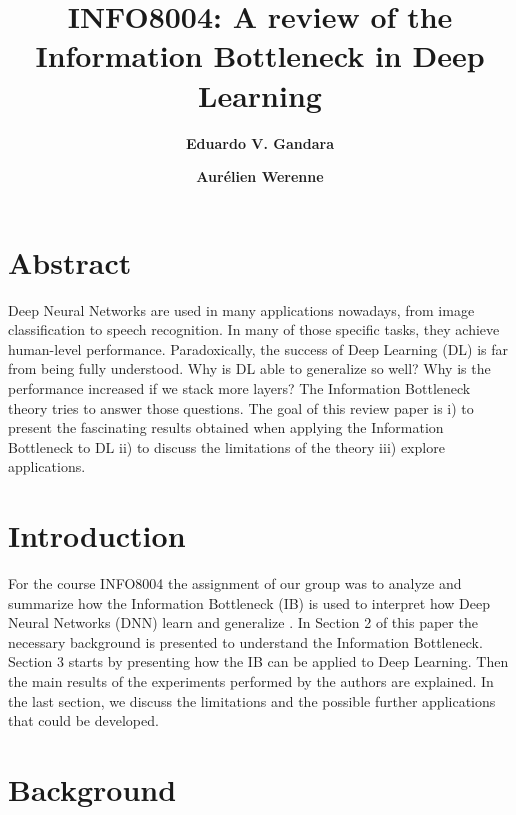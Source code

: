 \documentclass[twocolumn,superscriptaddress,aps]{revtex4-1}
\begin{document}

\title{\Large{INFO8004: A review of the Information Bottleneck in Deep Learning}}
\vspace{1cm}
\author{\small{\bf Eduardo V. Gandara}}
\author{\small{\bf Aurélien Werenne}}

\maketitle


\section*{Abstract}

Deep Neural Networks are used in many applications nowadays, from image classification to speech recognition. In many of those specific tasks, they achieve human-level performance. Paradoxically, the success of Deep Learning (DL) is far from being fully understood. Why is DL able to generalize so well? Why is the performance increased if we stack more layers? The Information Bottleneck theory tries to answer those questions. The goal of this review paper is i) to present the fascinating results obtained when applying the Information Bottleneck to DL ii) to discuss the limitations of the theory iii) explore applications. 


\section{Introduction}

For the course INFO8004 the assignment of our group was to analyze and summarize how the Information Bottleneck (IB) is used to interpret how Deep Neural Networks (DNN) learn and generalize \citep{Tishby2, Tishby3}. In Section 2 of this paper the necessary background is presented to understand the Information Bottleneck. Section 3 starts by presenting how the IB can be applied to Deep Learning. Then the main results of the experiments performed by the authors are explained. In the last section, we discuss the limitations and the possible further applications that could be developed.


\section{Background}\label{sec:background}
\end{document}
